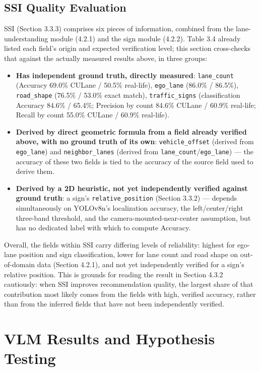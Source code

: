 \documentclass[12pt,a4paper]{report}
\begin{document}
\subsection{SSI Quality Evaluation}

SSI (Section 3.3.3) comprises six pieces of information, combined from the lane-understanding module (4.2.1) and the sign module (4.2.2). Table 3.4 already listed each field's origin and expected verification level; this section cross-checks that against the actually measured results above, in three groups:

\begin{itemize}
    \item \textbf{Has independent ground truth, directly measured}: \texttt{lane\_count} (Accuracy 69.0\% CULane / 50.5\% real-life), \texttt{ego\_lane} (86.0\% / 86.5\%), \texttt{road\_shape} (76.5\% / 53.0\% exact match), \texttt{traffic\_signs} (classification Accuracy 84.6\% / 65.4\%; Precision by count 84.6\% CULane / 60.9\% real-life; Recall by count 55.0\% CULane / 60.9\% real-life).
    \item \textbf{Derived by direct geometric formula from a field already verified above, with no ground truth of its own}: \texttt{vehicle\_offset} (derived from \texttt{ego\_lane}) and \texttt{neighbor\_lanes} (derived from \texttt{lane\_count}/\texttt{ego\_lane}) --- the accuracy of these two fields is tied to the accuracy of the source field used to derive them.
    \item \textbf{Derived by a 2D heuristic, not yet independently verified against ground truth}: a sign's \texttt{relative\_position} (Section 3.3.2) --- depends simultaneously on YOLOv8n's localization accuracy, the left/center/right three-band threshold, and the camera-mounted-near-center assumption, but has no dedicated label with which to compute Accuracy.
\end{itemize}

Overall, the fields within SSI carry differing levels of reliability: highest for ego-lane position and sign classification, lower for lane count and road shape on out-of-domain data (Section 4.2.1), and not yet independently verified for a sign's relative position. This is grounds for reading the result in Section 4.3.2 cautiously: when SSI improves recommendation quality, the largest share of that contribution most likely comes from the fields with high, verified accuracy, rather than from the inferred fields that have not been independently verified.

\section{VLM Results and Hypothesis Testing}
\end{document}
